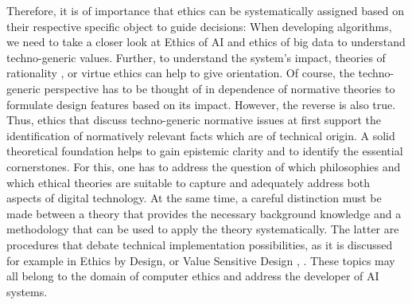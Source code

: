 \documentclass[manuscript,screen]{acmart}
\begin{document}
Therefore, it is of importance that ethics can be systematically assigned based on their respective specific object to guide decisions: When developing algorithms, we need to take a closer look at Ethics of AI and ethics of big data to understand techno-generic values. Further, to understand the system’s impact, theories of rationality \citep{nida2019structural}, \citep{knauff2021handbook} or virtue ethics \citep{vallor2016technology} can help to give orientation. Of course, the techno-generic perspective has to be thought of in dependence of normative theories to formulate design features based on its impact. However, the reverse is also true. Thus, ethics that discuss techno-generic normative issues at first support the identification of normatively relevant facts which are of technical origin. A solid theoretical foundation helps to gain epistemic clarity and to identify the essential cornerstones. For this, one has to address the question of which philosophies and which ethical theories are suitable to capture and adequately address both aspects of digital technology. At the same time, a careful distinction must be made between a theory that provides the necessary background knowledge and a methodology that can be used to apply the theory systematically.   The latter are procedures that debate technical implementation possibilities, as it is discussed for example in Ethics by Design, or Value Sensitive Design \citep{dignum2018ethics}, \citep{friedman2019value}. These topics may all belong to the domain of computer ethics and address the developer of AI systems.
\end{document}
